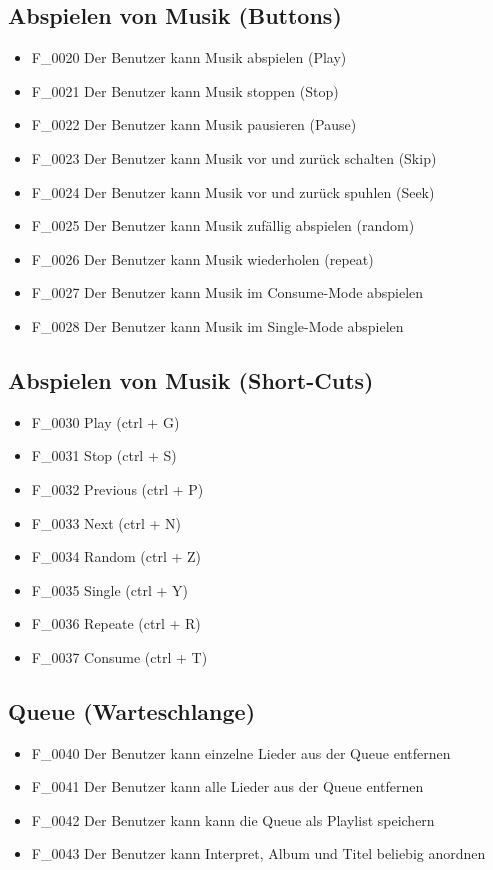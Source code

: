 \subsection{Abspielen von Musik (Buttons)}
\begin{itemize}
	\item F\_0020 Der Benutzer kann Musik abspielen (Play)
	\item F\_0021 Der Benutzer kann Musik stoppen (Stop)
	\item F\_0022 Der Benutzer kann Musik pausieren (Pause)
	\item F\_0023 Der Benutzer kann Musik vor und zurück schalten (Skip)
	\item F\_0024 Der Benutzer kann Musik vor und zurück spuhlen (Seek)
	\item F\_0025 Der Benutzer kann Musik zufällig abspielen (random)
	\item F\_0026 Der Benutzer kann Musik wiederholen (repeat)
	\item F\_0027 Der Benutzer kann Musik im Consume-Mode abspielen
	\item F\_0028 Der Benutzer kann Musik im Single-Mode abspielen
\end{itemize}
\subsection{Abspielen von Musik (Short-Cuts)}
\begin{itemize}
	\item F\_0030 Play 	(ctrl + G)
        \item F\_0031 Stop 	(ctrl + S)
        \item F\_0032 Previous 	(ctrl + P)
        \item F\_0033 Next	(ctrl + N)
	\item F\_0034 Random	(ctrl + Z)
	\item F\_0035 Single	(ctrl + Y)
	\item F\_0036 Repeate	(ctrl + R)
	\item F\_0037 Consume	(ctrl + T)
\end{itemize}
\subsection{Queue (Warteschlange)}
\begin{itemize}
	\item F\_0040 Der Benutzer kann einzelne Lieder aus der Queue entfernen
	\item F\_0041 Der Benutzer kann alle Lieder aus der Queue entfernen
	\item F\_0042 Der Benutzer kann kann die Queue als Playlist speichern
	\item F\_0043 Der Benutzer kann Interpret, Album und Titel beliebig anordnen
\end{itemize}
